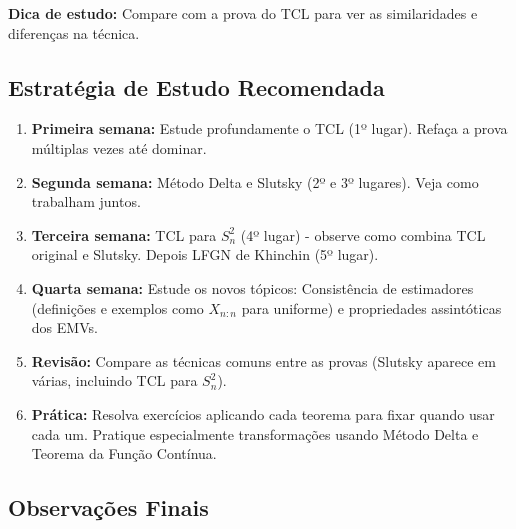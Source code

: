 \documentclass[12pt,a4paper]{article}
\theoremstyle{plain}
\theoremstyle{definition}
\theoremstyle{remark}
\begin{document}
\textbf{Dica de estudo:} Compare com a prova do TCL para ver as similaridades e diferenças na técnica.

\subsection{Estratégia de Estudo Recomendada}

\begin{enumerate}
    \item \textbf{Primeira semana:} Estude profundamente o TCL (1º lugar). Refaça a prova múltiplas vezes até dominar.
    
    \item \textbf{Segunda semana:} Método Delta e Slutsky (2º e 3º lugares). Veja como trabalham juntos.
    
    \item \textbf{Terceira semana:} TCL para $S_n^2$ (4º lugar) - observe como combina TCL original e Slutsky. Depois LFGN de Khinchin (5º lugar).
    
    \item \textbf{Quarta semana:} Estude os novos tópicos: Consistência de estimadores (definições e exemplos como $X_{n:n}$ para uniforme) e propriedades assintóticas dos EMVs.
    
    \item \textbf{Revisão:} Compare as técnicas comuns entre as provas (Slutsky aparece em várias, incluindo TCL para $S_n^2$).
    
    \item \textbf{Prática:} Resolva exercícios aplicando cada teorema para fixar quando usar cada um. Pratique especialmente transformações usando Método Delta e Teorema da Função Contínua.
\end{enumerate}

\subsection{Observações Finais}
\end{document}
